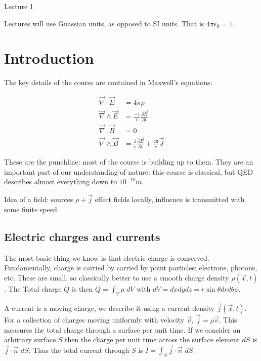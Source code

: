 \begin{center}

Lecture 1

\end{center}

Lectures will use Guassian units, as opposed to SI units. That is $4 \pi \epsilon_0 = 1$.

\section*{Introduction}

The key details of the course are contained in Maxwell's equations:

\begin{align*}
\vec{\nabla} \cdot \vec{E} &= 4 \pi \rho \\
\vec{\nabla} \wedge \vec{E} &= \frac{-1}{c} \frac{\partial \vec{B}}{\partial t} \\
\vec{\nabla} \cdot \vec{B} &= 0 \\
\vec{\nabla} \wedge \vec{B} &= \frac{1}{c} \frac{\partial \vec{E}}{\partial t} + \frac{4 \pi}{c} \vec{J}
\end{align*}


These are the punchline: most of the course is building up to them. They are an important part of our understanding of nature: this course is classical, but QED describes almost everything down to $10^{-18} m$.

Idea of a field: sources $\rho + \vec{j}$ effect fields locally, influence is transmitted with some finite speed.

\subsection*{Electric charges and currents}

The most basic thing we know is that electric charge is conserved. Fundamentally, charge is carried by carried by point particles: electrons, photons, etc. These are small, so classically better to use a smooth charge density $\rho (\vec{x}, t)$. The Total charge $Q$ is then $Q = \int_V \rho \,\, dV$ with $dV = dx dy dz = r \sin \theta dr d\theta \phi$.

A current is a moving charge, we describe it using a current density $\vec{j} (\vec{x}, t)$. For a collection of charges moving uniformly with velocity $\vec{v}$, $\vec{j} = \rho \vec{v}$. This measures the total charge through a surface per unit time. If we consider an arbitrary surface $S$ then the charge per unit time across the surface element $dS$ is $\vec{j} \cdot \vec{n} \, \, dS$. Thus the total current through $S$ is $I = \int_S \vec{j} \cdot \vec{n}  \, \,dS$. 

